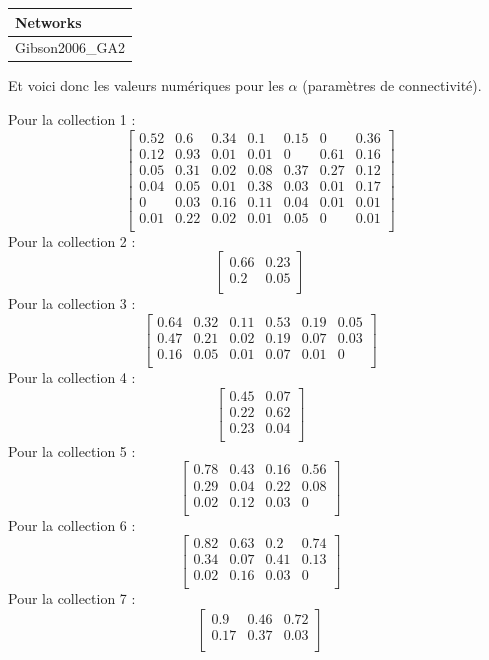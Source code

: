 \begin{longtable}[]{@{}l@{}}
\toprule
Networks\tabularnewline
\midrule
\endhead
Gibson2006\_GA2\tabularnewline
\bottomrule
\end{longtable}

Et voici donc les valeurs numériques pour les \(\alpha\) (paramètres de
connectivité).

Pour la collection 1 :
\[\begin{bmatrix} 0.52 &0.6 &0.34 &0.1 &0.15 &0 &0.36 \\0.12 &0.93 &0.01 &0.01 &0 &0.61 &0.16 \\0.05 &0.31 &0.02 &0.08 &0.37 &0.27 &0.12 \\0.04 &0.05 &0.01 &0.38 &0.03 &0.01 &0.17 \\0 &0.03 &0.16 &0.11 &0.04 &0.01 &0.01 \\0.01 &0.22 &0.02 &0.01 &0.05 &0 &0.01 \\ \end{bmatrix}\]
Pour la collection 2 :
\[\begin{bmatrix} 0.66 &0.23 \\0.2 &0.05 \\ \end{bmatrix}\] Pour la
collection 3 :
\[\begin{bmatrix} 0.64 &0.32 &0.11 &0.53 &0.19 &0.05 \\0.47 &0.21 &0.02 &0.19 &0.07 &0.03 \\0.16 &0.05 &0.01 &0.07 &0.01 &0 \\ \end{bmatrix}\]
Pour la collection 4 :
\[\begin{bmatrix} 0.45 &0.07 \\0.22 &0.62 \\0.23 &0.04 \\ \end{bmatrix}\]
Pour la collection 5 :
\[\begin{bmatrix} 0.78 &0.43 &0.16 &0.56 \\0.29 &0.04 &0.22 &0.08 \\0.02 &0.12 &0.03 &0 \\ \end{bmatrix}\]
Pour la collection 6 :
\[\begin{bmatrix} 0.82 &0.63 &0.2 &0.74 \\0.34 &0.07 &0.41 &0.13 \\0.02 &0.16 &0.03 &0 \\ \end{bmatrix}\]
Pour la collection 7 :
\[\begin{bmatrix} 0.9 &0.46 &0.72 \\0.17 &0.37 &0.03 \\ \end{bmatrix}\]
